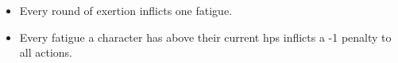\subsubsection*{}
\begin{itemize}
  \item
  Every round of exertion inflicts one \gls{fatigue}.
  \item
  Every \gls{fatigue} a character has above their current \glspl{hp} inflicts a -1 penalty to all actions.
\end{itemize}
